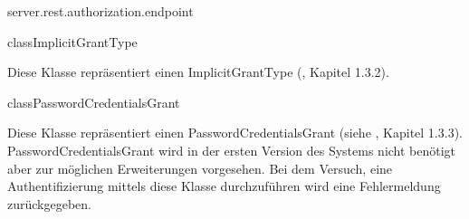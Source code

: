 \begin{texdocpackage}{server.rest.authorization.endpoint}
\begin{texdocclass}{class}{ImplicitGrantType}
\label{texdoclet:edu.kit.informatik.studyplan.server.rest.authorization.endpoint.ImplicitGrantType}
\begin{texdocclassintro}
Diese Klasse repräsentiert einen ImplicitGrantType (\cite{rfc6749}, Kapitel 1.3.2).\end{texdocclassintro}
\begin{texdocclassconstructors}
\end{texdocclassconstructors}
\begin{texdocclassmethods}
\end{texdocclassmethods}
\end{texdocclass}


\begin{texdocclass}{class}{PasswordCredentialsGrant}
\label{texdoclet:edu.kit.informatik.studyplan.server.rest.authorization.endpoint.PasswordCredentialsGrant}
\begin{texdocclassintro}
Diese Klasse repräsentiert einen PasswordCredentialsGrant  (siehe \cite{rfc6749},  Kapitel 1.3.3).
 PasswordCredentialsGrant wird in der ersten Version des Systems nicht benötigt aber zur möglichen 
 Erweiterungen vorgesehen.
  Bei dem Versuch, eine Authentifizierung mittels diese Klasse durchzuführen wird eine Fehlermeldung
 zurückgegeben.\end{texdocclassintro}
\begin{texdocclassconstructors}
\end{texdocclassconstructors}
\begin{texdocclassmethods}
\end{texdocclassmethods}
\end{texdocclass}



\end{texdocpackage}
